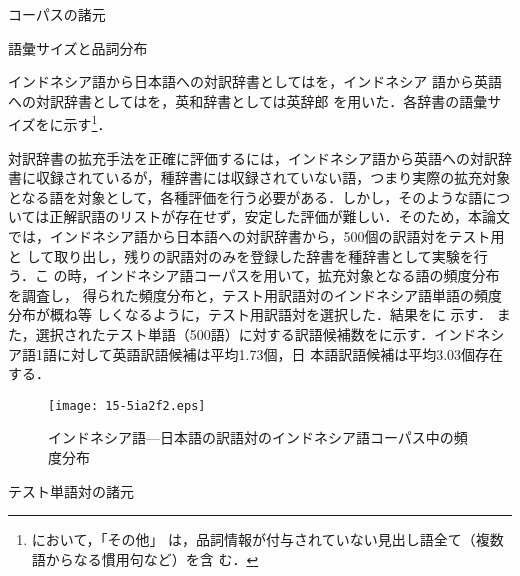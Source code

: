 \documentclass[japanese]{jnlp_1.4}
\newcommand{\tabref}[1]{}
\newcommand{\figref}[1]{}
\begin{document}
\begin{table}[b]
  \caption{コーパスの諸元}
  \label{tbl:コーパスの諸元}
  \begin{center}

  \end{center}
\end{table}
\begin{table}[b]
  \caption{語彙サイズと品詞分布}
  \label{tbl:語彙サイズと品詞分布}
  \begin{center}

  \end{center}
\end{table}


インドネシア語から日本語への対訳辞書としては\cite{IEDIC}を，インドネシア
語から英語への対訳辞書としては\cite{IEDIC}を，英和辞書としては英辞郎
\cite{EJDIC}を用いた．各辞書の語彙サイズを\tabref{tbl:語彙サイズと品詞分
布}に示す\footnote{\tabref{tbl:語彙サイズと品詞分布}において，「その他」
は，品詞情報が付与されていない見出し語全て（複数語からなる慣用句など）を含
む．}．

対訳辞書の拡充手法を正確に評価するには，インドネシア語から英語への対訳辞
書に収録されているが，種辞書には収録されていない語，つまり実際の拡充対象
となる語を対象として，各種評価を行う必要がある．しかし，そのような語につ
いては正解訳語のリストが存在せず，安定した評価が難しい．そのため，本論文
では，インドネシア語から日本語への対訳辞書から，500個の訳語対をテスト用と
して取り出し，残りの訳語対のみを登録した辞書を種辞書として実験を行う．こ
の時，インドネシア語コーパスを用いて，拡充対象となる語の頻度分布を調査し，
得られた頻度分布と，テスト用訳語対のインドネシア語単語の頻度分布が概ね等
しくなるように，テスト用訳語対を選択した．結果を\figref{fig:テスト単語}に
示す．
また，選択されたテスト単語（500語）に対する訳語候補数を\tabref{tbl:テスト単
語対の諸元}に示す．インドネシア語1語に対して英語訳語候補は平均1.73個，日
本語訳語候補は平均3.03個存在する．

\begin{figure}[b]
  \begin{center}
   \texttt{[image: 15-5ia2f2.eps]}
  \end{center}
  \caption{インドネシア語—日本語の訳語対のインドネシア語コーパス中の頻度分布}
  \label{fig:テスト単語}
\end{figure}
\begin{table}[b]
  \caption{テスト単語対の諸元}
  \label{tbl:テスト単語対の諸元}
  \begin{center}

  \end{center}
\end{table}
\end{document}
